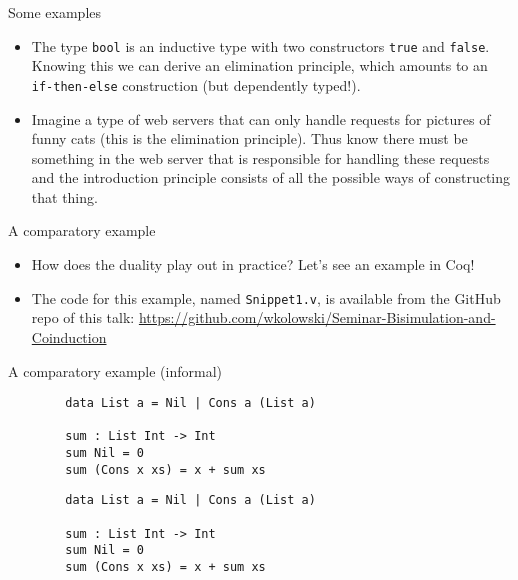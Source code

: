 \documentclass{beamer}
\begin{document}
\begin{frame}{Some examples}
\begin{itemize}
	\item The type \texttt{bool} is an inductive type with two constructors \texttt{true} and \texttt{false}. Knowing this we can derive an elimination principle, which amounts to an \texttt{if-then-else} construction (but dependently typed!).
	\item Imagine a type of web servers that can only handle requests for pictures of funny cats (this is the elimination principle). Thus know there must be something in the web server that is responsible for handling these requests and the introduction principle consists of all the possible ways of constructing that thing.
\end{itemize}
\end{frame}

\begin{frame}{A comparatory example}
\begin{itemize}
	\item How does the duality play out in practice? Let's see an example in Coq!
	\item The code for this example, named \texttt{Snippet1.v}, is available from the GitHub repo of this talk: \url{https://github.com/wkolowski/Seminar-Bisimulation-and-Coinduction}
\end{itemize}
\end{frame}

\begin{frame}[fragile]{A comparatory example (informal)}
\noindent
\begin{minipage}[l]{0.45\linewidth}
	\begin{verbatim}
		data List a = Nil | Cons a (List a)

		sum : List Int -> Int
		sum Nil = 0
		sum (Cons x xs) = x + sum xs
	\end{verbatim}
\end{minipage}
\noindent
\begin{minipage}[b]{0.45\linewidth}
	\begin{verbatim}
		data List a = Nil | Cons a (List a)

		sum : List Int -> Int
		sum Nil = 0
		sum (Cons x xs) = x + sum xs
	\end{verbatim}
\end{minipage}
\end{frame}

\end{document}
